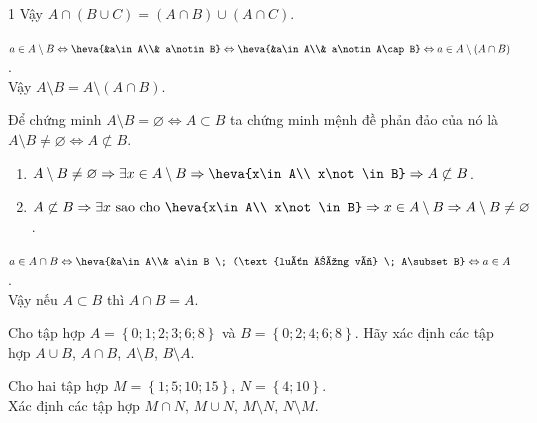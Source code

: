 \begin{bt}
{\begin{enumEX}{1}
			Vậy $A \cap (B \cup C) = (A \cap B) \cup  (A \cap C)$.
			\item $a\in A \setminus B \Leftrightarrow \heva{&a\in A\\& a\notin B}\Leftrightarrow \heva{&a\in A\\& a\notin A\cap  B} \Leftrightarrow a\in A \setminus (A \cap B)$.\\
			Vậy $A \setminus B = A \setminus (A \cap B)$. 
			\item Để chứng  minh $A\setminus B=\varnothing \Leftrightarrow A\subset B$ ta chứng minh mệnh đề phản đảo của nó là $A\setminus B\neq\varnothing \Leftrightarrow A\not\subset B$.\\
			\begin{enumerate}
				\item[Thuận:] $A\setminus B\neq \varnothing\Rightarrow \exists  x\in A\setminus B\Rightarrow \heva{x\in A\\ x\not\in B}\Rightarrow A\not\subset B$.
				\item[Đảo:] $A\not \subset B\Rightarrow \exists x \text{ sao cho  } \heva{x\in A\\ x\not \in B}\Rightarrow x\in A\setminus B\Rightarrow A\setminus B\neq \varnothing$.
			\end{enumerate}
			\item $a\in A \cap B \Leftrightarrow \heva{&a\in A\\& a\in B \; (\text{luôn đúng vì} \; A\subset B}  \Leftrightarrow a\in A$.\\
			Vậy nếu $A \subset B$ thì $A \cap B  = A$.
	\end{enumEX}}
\end{bt}

\begin{bt}%
Cho tập hợp $A=\left\{{0;1;2;3;6;8}\right\}$ và $B=\left\{{0;2;4;6;8}\right\}$. Hãy xác định các tập hợp $A\cup B$, $A\cap B$, $A\setminus B$, $B\setminus A$.
\end{bt}

\begin{bt}[1,0 điểm]%
	Cho hai tập hợp $M = \left\lbrace 1; 5; 10; 15\right\rbrace$, $N = \left\lbrace 4; 10\right\rbrace$.\\
	Xác định các tập hợp $M\cap N$, $M\cup N$, $M\setminus N$, $N\setminus M$.
\end{bt}

